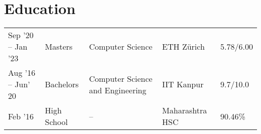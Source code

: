 %

\section*{Education}
\begin{tabulary}{\textwidth}{L L L L L}

\toprule
{} &  &  &  & \\
\midrule
Sep '20 -- Jan '23 & Masters & Computer Science & ETH Zürich & 5.78/6.00\\%
Aug '16 -- Jun' 20 & Bachelors & Computer Science and Engineering & IIT Kanpur & 9.7/10.0\\%
Feb '16 & High School & -- & Maharashtra HSC & 90.46\%\\%
\bottomrule

\end{tabulary}
